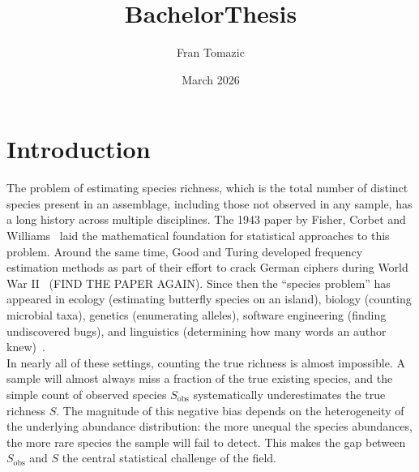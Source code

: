 \documentclass{article}
\title{BachelorThesis}
\author{Fran Tomazic}
\date{March 2026}
\begin{document}
\maketitle

\section{Introduction}

The problem of estimating species richness, which is the total number of distinct species present in an assemblage, including those not observed in any sample, has a long history across multiple disciplines. The 1943 paper by Fisher, Corbet and Williams~\cite{fisher1943} laid the mathematical foundation for statistical approaches to this problem. Around the same time, Good and Turing developed frequency estimation methods as part of their effort to crack German ciphers during World War II~\cite{good1953,good2000} (FIND THE PAPER AGAIN). Since then the ``species problem'' has appeared in ecology (estimating butterfly species on an island), biology (counting microbial taxa), genetics (enumerating alleles), software engineering (finding undiscovered bugs), and linguistics (determining how many words an author knew)~\cite{bunge1993,chao2005,chao2016species}.\\

In nearly all of these settings, counting the true richness is almost impossible. A sample will almost always miss a fraction of the true existing species, and the simple count of observed species $S_{\mathrm{obs}}$ systematically underestimates the true richness $S$. The magnitude of this negative bias depends on the heterogeneity of the underlying abundance distribution: the more unequal the species abundances, the more rare species the sample will fail to detect. This makes the gap between $S_{\mathrm{obs}}$ and $S$ the central statistical challenge of the field.\\
\end{document}
